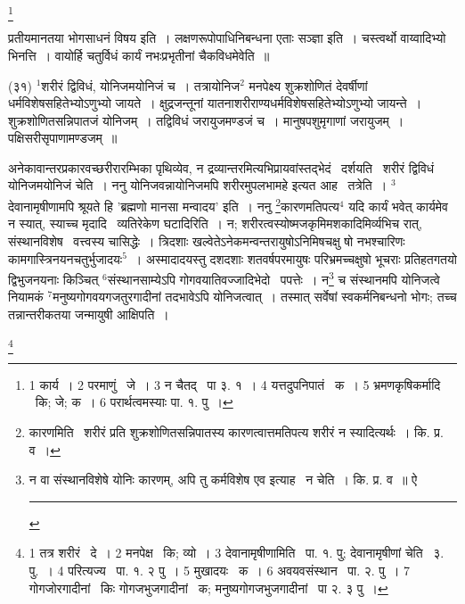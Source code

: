 \documentclass[11pt, openany]{book}
\newcommand\blfootnote[1]{%
 \begingroup
 \renewcommand\thefootnote{}\footnote{#1}%
 \addtocounter{footnote}{-1}%
 \endgroup
}
\begin{document}
\blfootnote{1 कार्य~। 2 परमाणुं  \textendash\ जे~। 3 न चैतद्  \textendash\ पा ३. १~। 4 यत्तदुपनिपातं  \textendash\ क~। 5 भ्रमणकृषिकर्मादि  \textendash\ कि; जे; क~। 6 परार्थत्वमस्याः पा. १. पु~।}

\newpage
\noindent
प्रतीयमानतया भोगसाधनं विषय इति~। लक्षणरूपोपाधिनिबन्धना एताः सञ्ज्ञा इति~। चस्त्वर्थो वाय्वादिभ्यो भिनत्ति~। वायोर्हि चतुर्विधं कार्यं नभःप्रभृतीनां चैकविधमेवेति~॥

\hangindent=2cm {\knu (३१) ${}^1$शरीरं द्विविधं, योनिजमयोनिजं च~। तत्रायोनिज$^2$ मनपेक्ष्य शुक्रशोणितं देवर्षीणां धर्मविशेषसहितेभ्योऽणुभ्यो जायते~। क्षुद्रजन्तूनां यातनाशरीराण्यधर्मविशेषसहितेभ्योऽणुभ्यो जायन्ते~। शुक्रशोणितसन्निपातजं योनिजम्~। तद्विविधं जरायुजमण्डजं च~। मानुषपशुमृगाणां जरायुजम्~। पक्षिसरीसृपाणामण्डजम्~॥}

अनेकावान्तरप्रकारवच्छरीरारम्भिका पृथिव्येव, न द्रव्यान्तरमित्यभिप्रायवांस्तद्भेदं \ दर्शयति \textendash\ शरीरं द्विविधं योनिजमयोनिजं चेति~। ननु योनिजवन्नायोनिजमपि शरीरमुपलभामहे इत्यत आह \textendash\ तत्रेति~। ${}^3$देवानामृषीणामपि श्रूयते हि 'ब्रह्मणो मानसा मन्वादय' इति~। ननु \renewcommand{\thefootnote}{१}\footnote{कारणमिति \textendash\ शरीरं प्रति शुक्रशोणितसन्निपातस्य कारणत्वात्तमतिपत्य शरीरं न स्यादित्यर्थः~। कि. प्र. व~।}कारणमतिपत्य$^4$ यदि कार्यं भवेत् कार्यमेव न स्यात्, स्याच्च मृदादि \textendash\ व्यतिरेकेण घटादिरिति~। न; शरीरत्वस्योष्मजकृमिमशकादिमिर्व्यभिच रात्, संस्थानविशेष \textendash\ वत्त्वस्य चासिद्धेः~। त्रिदशाः खल्वेतेऽनेकमन्वन्तरायुषोऽनिमिषचक्षु षो नभश्चारिणः कामगास्त्रिनयनचतुर्भुजादयः$^5$~। अस्मादादयस्तु दशदशाः शतवर्षपरमायुषः परिभ्रमच्चक्षुषो भूचराः प्रतिहतगतयो द्विभुजनयनाः किञ्चित् ${}^6$संस्थानसाम्येऽपि गोगवयातिवज्जादिभेदो \textendash\ पपत्तेः~। न\renewcommand{\thefootnote}{२}\footnote{न वा संस्थानविशेषे योनिः कारणम्, अपि तु कर्मविशेष एव इत्याह \textendash\ न चेति~। कि. प्र. व~॥ ऐ\\ \rule{0.4\linewidth}{0.5pt}} च संस्थानमपि योनिजत्वे नियामकं ${}^7$मनुष्यगोगवयगजतुरगादीनां तदभावेऽपि योनिजत्वात्~। तस्मात् सर्वेषां स्वकर्मनिबन्धनो भोगः; तच्च तन्नान्तरीकतया जन्मायुषी आक्षिपति~।

\blfootnote{1 तत्र शरीरं  \textendash\ दे~। 2 मनपेक्ष  \textendash\ कि; व्यो~। 3 देवानामृषीणामिति \textendash\ पा. १. पु; देवानामृषीणां चेति  \textendash\ ३. पु.~। 4 परित्यज्य  \textendash\ पा. १. २ पु~। 5 मुखादयः  \textendash\ क~। 6 अवयवसंस्थान  \textendash\ पा. २. पु~। 7 गोगजोरगादीनां  \textendash\ किः गोगजभुजगादीनां  \textendash\ क; मनुष्यगोगजभुजगादीनां  \textendash\ पा २. ३ पु~।}
\end{document}
